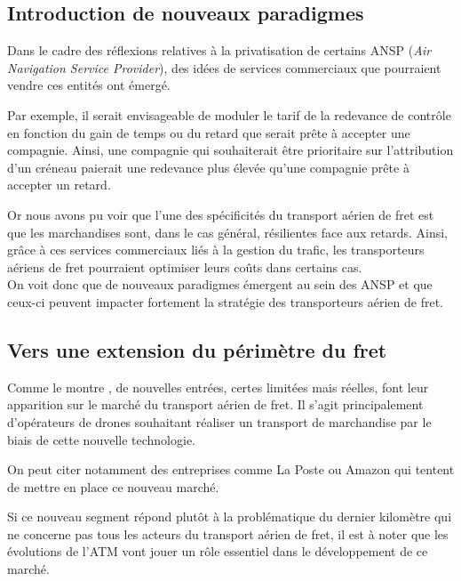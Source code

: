 \subsection{Introduction de nouveaux paradigmes}

Dans le cadre des réflexions relatives à la privatisation de certains ANSP (\textit{Air Navigation Service Provider}), des idées de services commerciaux que pourraient vendre ces entités ont émergé.

Par exemple, il serait envisageable de moduler le tarif de la redevance de contrôle en fonction du gain de temps ou du retard que serait prête à accepter une compagnie. Ainsi, une compagnie qui souhaiterait être prioritaire sur l'attribution d'un créneau paierait une redevance plus élevée qu'une compagnie prête à accepter un retard.

Or nous avons pu voir que l'une des spécificités du transport aérien de fret est que les marchandises sont, dans le cas général, résilientes face aux retards. Ainsi, grâce à ces services commerciaux liés à la gestion du trafic, les transporteurs aériens de fret pourraient optimiser leurs coûts dans certains cas.\\

On voit donc que de nouveaux paradigmes émergent au sein des ANSP et que ceux-ci peuvent impacter fortement la stratégie des transporteurs aérien de fret.

\subsection{Vers une extension du périmètre du fret}


Comme le montre \cite{RePEc:eee:jaitra:v:61:y:2017:i:c:p:34-40}, de nouvelles entrées, certes limitées mais réelles, font leur apparition sur le marché du transport aérien de fret. Il s'agit principalement d'opérateurs de drones souhaitant réaliser un transport de marchandise par le biais de cette nouvelle technologie.

On peut citer notamment des entreprises comme La Poste \cite{gradt_2016} ou Amazon \cite{figaro_2016} qui tentent de mettre en place ce nouveau marché.

Si ce nouveau segment répond plutôt à la problématique du dernier kilomètre qui ne concerne pas tous les acteurs du transport aérien de fret, il est à noter que les évolutions de l'ATM vont jouer un rôle essentiel dans le développement de ce marché.

